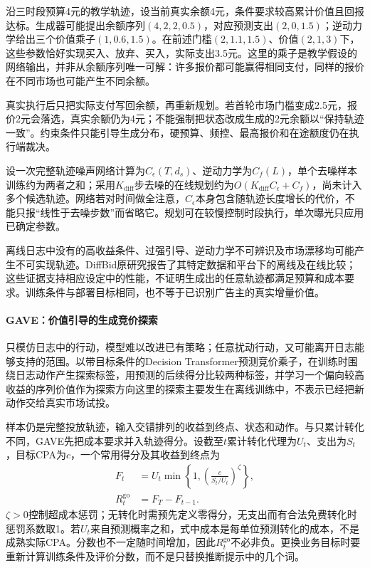 沿三时段预算4元的教学轨迹，设当前真实余额4元，条件要求较高累计价值且回报达标。生成器可能提出余额序列$(4,2,2,0.5)$，对应预测支出$(2,0,1.5)$；逆动力学给出三个价值乘子$(1,0.6,1.5)$。在前述门槛$(2,1.1,1.5)$、价值$(2,1,3)$下，这些参数恰好实现买入、放弃、买入，实际支出3.5元。这里的乘子是教学假设的网络输出，并非从余额序列唯一可解：许多报价都可能赢得相同支付，同样的报价在不同市场也可能产生不同余额。

真实执行后只把实际支付写回余额，再重新规划。若首轮市场门槛变成2.5元，报价2元会落选，真实余额仍为4元；不能强制把状态改成生成的2元余额以“保持轨迹一致”。约束条件只能引导生成分布，硬预算、频控、最高报价和在途额度仍在执行端裁决。

设一次完整轨迹噪声网络计算为$C_\epsilon(T,d_s)$、逆动力学为$C_f(L)$，单个去噪样本训练约为两者之和；采用$K_{\mathrm{diff}}$步去噪的在线规划约为$O(K_{\mathrm{diff}}C_\epsilon+C_f)$，尚未计入多个候选轨迹。网络若对时间做全注意，$C_\epsilon$本身包含随轨迹长度增长的代价，不能只报“线性于去噪步数”而省略它。规划可在较慢控制时段执行，单次曝光只应用已确定参数。

离线日志中没有的高收益条件、过强引导、逆动力学不可辨识及市场漂移均可能产生不可实现轨迹。DiffBid原研究报告了其特定数据和平台下的离线及在线比较；这些证据支持相应设定中的性能，不证明生成出的任意轨迹都满足预算和成本要求。训练条件与部署目标相同，也不等于已识别广告主的真实增量价值。

\paragraph{GAVE：价值引导的生成竞价探索}
\label{sec:rs-advertising-gave}

只模仿日志中的行动，模型难以改进已有策略；任意扰动行动，又可能离开日志能够支持的范围。以带目标条件的Decision Transformer预测竞价乘子，在训练时围绕日志动作产生探索标签，用预测的后续得分比较两种标签，并学习一个偏向较高收益的序列价值作为探索方向这里的探索主要发生在离线训练中，不表示已经把新动作交给真实市场试投。

样本仍是完整投放轨迹，输入交错排列的收益到终点、状态和动作。与只累计转化不同，GAVE先把成本要求并入轨迹得分。设截至$t$累计转化代理为$U_t$、支出为$S_t$，目标CPA为$c$，一个常用得分及其收益到终点为
\begin{equation}
  \begin{aligned}
    F_t&=U_t\min\left\{1,
         \left(\frac{c}{S_t/U_t}\right)^\zeta\right\},\\
    R_t^{\mathrm{go}}&=F_T-F_{t-1}.
  \end{aligned}
  \label{eq:rs-advertising-gave-score}
\end{equation}
$\zeta>0$控制超成本惩罚；无转化时需预先定义零得分，无支出而有合法免费转化时惩罚系数取1。若$U_t$来自预测概率之和，式中成本是每单位预测转化的成本，不是成熟实际CPA。分数也不一定随时间增加，因此$R_t^{\mathrm{go}}$不必非负。更换业务目标时要重新计算训练条件及评价分数，而不是只替换推断提示中的几个词。

